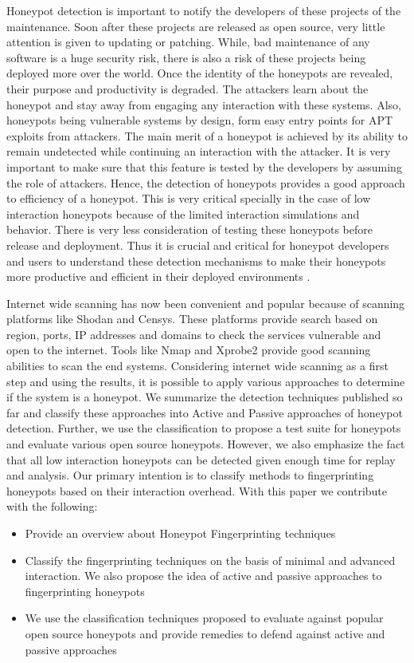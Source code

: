 \documentclass[letterpaper, 10 pt, conference]{ieeeconf}  %
\begin{document}
Honeypot detection is important to notify the developers of these projects of the maintenance. Soon after these projects are released as open source, very little attention is given to updating or patching. While, bad maintenance of any software is a huge security risk, there is also a risk of these projects being deployed more over the world. Once the identity of the honeypots are revealed, their purpose and productivity is degraded. The attackers learn about the honeypot and stay away from engaging any interaction with these systems. Also, honeypots being vulnerable systems by design, form easy entry points for APT exploits from attackers. The main merit of a honeypot is achieved by its ability to remain undetected while continuing an interaction with the attacker. It is very important to make sure that this feature is tested by the developers by assuming the role of attackers. Hence, the detection of honeypots provides a good approach to efficiency of a honeypot. This is very critical specially in the case of low interaction honeypots because of the limited interaction simulations and behavior. There is very less consideration of testing these honeypots before release and deployment. Thus it is crucial and critical for honeypot developers and users to understand these detection mechanisms to make their honeypots more productive and efficient in their deployed environments . 


Internet wide scanning has now been convenient and popular because of scanning platforms like Shodan and Censys. These platforms provide search based on region, ports, IP addresses and domains to check the services vulnerable and  open to the internet. Tools like Nmap \cite{NMap} and Xprobe2 provide good scanning abilities to scan the end systems. Considering internet wide scanning as a first step and using the results, it is possible to apply various approaches to determine if the system is a honeypot. We summarize the detection techniques published so far and classify these approaches into Active and Passive approaches of honeypot detection. Further, we use the classification to propose a test suite for honeypots and evaluate various open source honeypots. However, we also emphasize the fact that all low interaction honeypots can be detected given enough time for replay and analysis. Our primary intention is to classify methods to fingerprinting honeypots based on their interaction overhead. With this paper we contribute with the following:

 \begin{itemize}
    \item Provide an overview about Honeypot Fingerprinting techniques
    \item Classify the fingerprinting techniques on the basis of minimal and advanced interaction. We also propose the idea of active and passive approaches to fingerprinting honeypots
    \item We use the classification techniques proposed to evaluate against popular open source honeypots and provide remedies to defend against active and passive approaches 
 \end{itemize}
\end{document}
